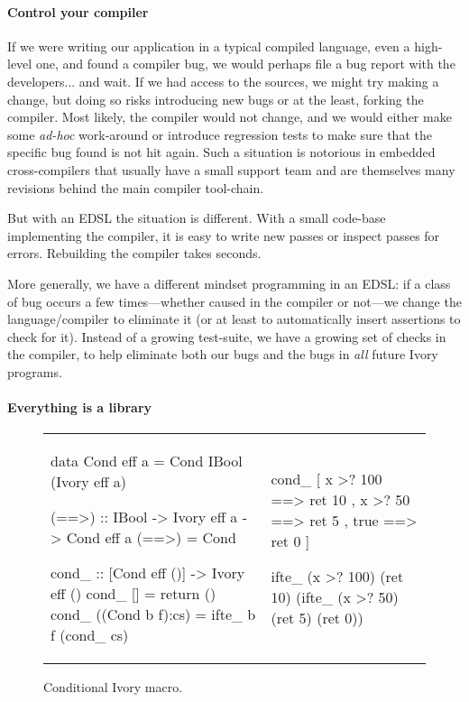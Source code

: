 \paragraph{Control your compiler}
If we were writing our application in a typical compiled language, even a
high-level one, and found a compiler bug, we would perhaps file a bug report
with the developers... and wait.  If we had access to the sources, we might try
making a change, but doing so risks introducing new bugs or at the least, forking
the compiler.  Most likely, the compiler would not change, and we would either
make some \emph{ad-hoc} work-around or introduce regression tests to make sure
that the specific bug found is not hit again.  Such a situation is notorious in
embedded cross-compilers that usually have a small support team and are
themselves many revisions behind the main compiler tool-chain.

But with an EDSL the situation is different.  With a small code-base
implementing the compiler, it is easy to write new passes or inspect passes for
errors.  Rebuilding the compiler takes seconds.

More generally, we have a different mindset programming in an EDSL: if a class
of bug occurs a few times---whether caused in the compiler or not---we change
the language/compiler to eliminate it (or at least to automatically insert
assertions to check for it).  Instead of a growing test-suite, we
have a growing set of checks in the compiler, to help eliminate both our bugs
and the bugs in \emph{all} future Ivory programs.

\paragraph{Everything is a library}

\begin{figure}
  \begin{tabular}{p{}|p{}}
    \begin{smcode}
data Cond eff a =
  Cond IBool (Ivory eff a)

(==>) :: IBool -> Ivory eff a
      -> Cond eff a
(==>) = Cond

cond_ :: [Cond eff ()]
      -> Ivory eff ()
cond_ [] = return ()
cond_ ((Cond b f):cs) =
  ifte_ b f (cond_ cs)
    \end{smcode} &
    \begin{smcode}
cond_
  [ x >? 100 ==> ret 10
  , x >? 50  ==> ret 5
  , true     ==> ret 0 ]

ifte_ (x >? 100)
 (ret 10)
 (ifte_ (x >? 50)
   (ret 5)
     (ret 0))
    \end{smcode}
  \end{tabular}
  \caption{Conditional Ivory macro.}
  \label{fig:ivory-cond}
\end{figure}

